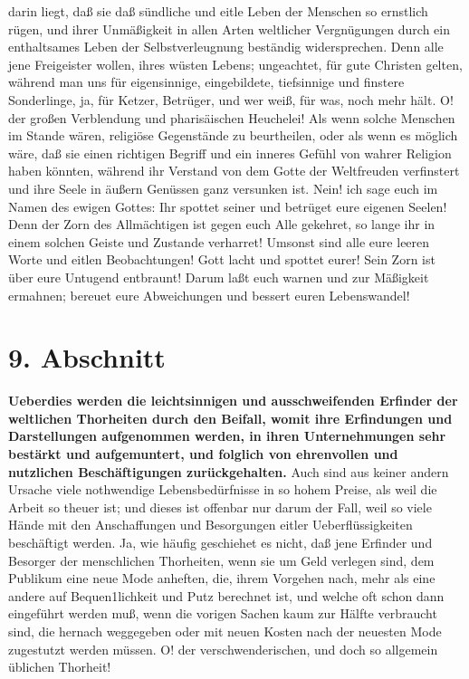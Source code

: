 {darin liegt, daß sie daß sündliche und eitle Leben der Menschen so ernstlich
rügen, und ihrer Unmäßigkeit in allen Arten weltlicher Vergnügungen durch ein
enthaltsames Leben der Selbstverleugnung beständig widersprechen. Denn alle jene
Freigeister wollen, ihres wüsten Lebens;
ungeachtet, für gute Christen gelten,
während man uns für eigensinnige, eingebildete, tiefsinnige und finstere
Sonderlinge, ja, für Ketzer, Betrüger, und wer weiß, für
was, noch mehr hält. O!
der großen Verblendung und pharisäischen Heuchelei! Als wenn solche Menschen im
Stande wären, religiöse Gegenstände zu beurtheilen, oder als wenn es möglich
wäre, daß sie einen richtigen Begriff und ein inneres Gefühl von wahrer Religion
haben könnten, während ihr Verstand von dem Gotte der Weltfreuden verfinstert
und ihre Seele in äußern Genüssen ganz versunken ist. Nein! ich sage euch im
Namen des ewigen Gottes: Ihr spottet seiner und betrüget eure eigenen Seelen!
Denn der Zorn des Allmächtigen ist gegen euch Alle gekehret, so lange ihr in
einem solchen Geiste und Zustande verharret! Umsonst sind alle eure leeren Worte
und eitlen Beobachtungen! Gott lacht und spottet eurer! Sein Zorn ist über eure
Untugend entbraunt! Darum laßt euch warnen und zur Mäßigkeit ermahnen; bereuet
eure Abweichungen und bessert euren Lebenswandel!

\section{9. Abschnitt} \label{kap17_ab9}

\textbf{Ueberdies werden die leichtsinnigen und
ausschweifenden Erfinder der weltlichen
Thorheiten durch den Beifall, womit ihre Erfindungen und Darstellungen
aufgenommen werden, in ihren Unternehmungen sehr bestärkt und aufgemuntert, und
folglich von ehrenvollen und nutzlichen Beschäftigungen zurückgehalten.} Auch
sind aus keiner andern Ursache viele nothwendige Lebensbedürfnisse in so hohem
Preise, als weil die Arbeit so theuer ist; und dieses ist offenbar nur darum der
Fall, weil so viele Hände mit den Anschaffungen und Besorgungen eitler
Ueberflüssigkeiten beschäftigt werden. Ja, wie häufig geschiehet es nicht, daß
jene Erfinder und Besorger der menschlichen Thorheiten, wenn sie um Geld
verlegen sind, dem Publikum eine neue Mode anheften, die, ihrem Vorgehen nach,
mehr als eine andere auf Bequen1lichkeit und Putz berechnet ist, und welche oft
schon dann eingeführt werden muß, wenn die vorigen Sachen kaum zur Hälfte
verbraucht sind, die hernach weggegeben oder mit neuen Kosten nach der neuesten
Mode zugestutzt werden müssen. O! der verschwenderischen, und doch so allgemein
üblichen Thorheit!

}
